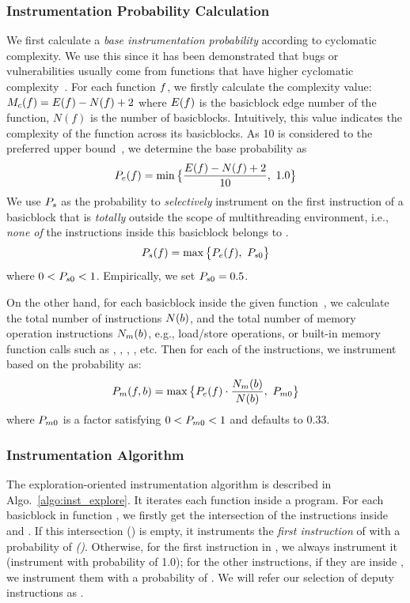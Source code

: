 \subsubsection{Instrumentation Probability Calculation}
We first calculate a \emph{base instrumentation probability} according to cyclomatic complexity. We use this since it has been demonstrated that bugs or vulnerabilities usually come from functions that have higher cyclomatic complexity~\cite{macabecc,vul_metric,fuzz_vul_metric}. For each function $f$, we firstly calculate the complexity value: $M_c(f) = E(f) - N(f) + 2$ where $E(f)$ is the basicblock edge number of the function, $N(f)$ is the number of basicblocks. Intuitively, this value indicates the complexity of the function across its basicblocks. As 10 is considered to the preferred upper bound~\cite{macabecc}, we determine the base probability as
\begin{equation}
    P_e(f) = \min\big\{\frac{E(f)-N(f)+2}{10}, ~1.0\big\}
\end{equation}
We use ${P_s}$ as the probability to \emph{selectively} instrument on the first instruction of a basicblock that is \emph{totally} outside the scope of multithreading environment, i.e., \emph{none of} the instructions inside this basicblock belongs to \mtiscope.
\begin{equation}
    {\ensuremath{P_s(f)}} = \max\big\{P_e(f), ~{P_{s0}}\big\}
\end{equation}
where $0<{P_{s0}}<1$. Empirically, we set ${P_{s0}}=0.5$.

On the other hand, for each basicblock \aBB inside the given function~\aFUNC, we calculate the total number of instructions $N(b)$, and the total number of memory operation instructions  $N_m(b)$, e.g., load/store operations, or built-in memory function calls such as , , , , etc. 
Then for each of the instructions, we instrument based on the probability as:
\begin{equation}
    {\ensuremath{P_m(f, b)}} = \max\big\{P_e(f)\cdot\frac{N_m(b)}{N(b)}, ~{P_{m0}} \big\}\end{equation}
where ${P_{m0}}$ is a factor satisfying $0<{P_{m0}}<1$ and defaults to $0.33$.

\subsubsection{Instrumentation Algorithm}
The exploration-oriented instrumentation algorithm is described in Algo.~\ref{algo:inst_explore}. It iterates each function inside a program. For each basicblock \aBB in function \aFUNC, we firstly get the intersection of the instructions inside \aBB and \mtiscope. If this intersection \mtiscope(\aBB) is empty, it instruments the \emph{first instruction} of \aBB with a probability of \emph{\stpn(\aFUNC)}. Otherwise, for the first instruction in \aBB, we always instrument it (instrument with probability of 1.0); for the other instructions, if they are inside \mtiscope, we instrument them with a probability of \mtp{\aFUNC}{\aBB}. We will refer our selection of deputy instructions as \MTIns.

